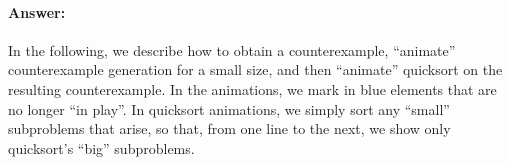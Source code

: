 \documentclass[a4paper]{article}
\newcommand*{\dave}[1]{{\color{red}\textbf{PDS: #1}}}
\begin{document}
\paragraph{Answer:}%
\newcommand*{\USED}[1]{{\color{blue}#1}}%
\newcommand{\HOLE}{{\rule[-.2ex]{1ex}{.4pt}}}%
\newcommand{\SWAP}{\leftrightarrow}%
\newcommand*{\argmedian}{\operatorname{argmedian}}%
\newcommand*{\set}[1]{\{#1\}}%
In the following, we describe how to obtain a counterexample, ``animate'' counterexample generation for a small size, and then ``animate'' quicksort on the resulting counterexample.
In the animations, we \USED{mark in blue} elements that are no longer ``in play''.
In quicksort animations, we simply sort any ``small'' subproblems that arise, so that, from one line to the next, we show only quicksort's ``big'' subproblems.
\end{document}
